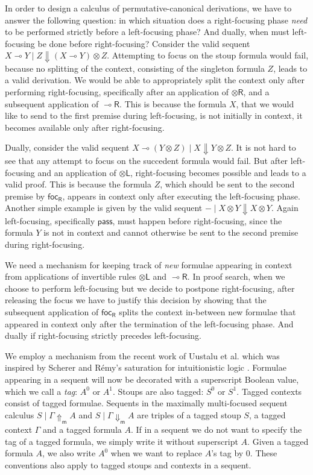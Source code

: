 \documentclass[runningheads]{llncs}
\newcommand{\tl}{\otimes \mathsf{L}}
\newcommand{\tr}{\otimes \mathsf{R}}
\newcommand{\lright}{{\multimap}\mathsf{R}}
\newcommand{\pass}{\mathsf{pass}}
\newcommand{\otL}{\tl}
\newcommand{\otR}{\tr}
\newcommand{\lolliR}{\lright}
\newcommand{\ot}{\otimes}
\newcommand{\lolli}{\multimap}
\newcommand{\dn}{\Downarrow}
\newcommand{\upm}{\Uparrow_{\mathsf{m}}}
\newcommand{\dnm}{\Downarrow_{\mathsf{m}}}
\newcommand{\focR}{\mathsf{foc_R}}
\begin{document}
In order to design a calculus of permutative-canonical derivations, we have to answer the following question: in which situation does a right-focusing phase \emph{need} to be performed strictly before a left-focusing phase? And dually, when must left-focusing be done before right-focusing? 
Consider the valid sequent $X \lolli Y \mid Z \dn (X \lolli Y) \ot Z$. Attempting to focus on the stoup formula would fail, because no splitting of the context, consisting of the singleton formula $Z$, leads to a valid derivation. We would be able to appropriately split the context only after performing right-focusing, specifically after an application of $\otR$, and a subsequent application of $\lolliR$. This is because the formula  $X$, that we would like to send to the first premise during left-focusing, is not initially in context, it becomes available only after right-focusing. 

Dually, consider the valid sequent $X \lolli (Y \ot Z) \mid X \dn Y \ot Z$. It is not hard to see that any attempt to focus on the succedent formula would fail. But after left-focusing and an application of $\otL$, right-focusing becomes possible and leads to a valid proof. This is because the formula $Z$, which should be sent to the second premise by $\focR$, appears in context only after executing the left-focusing phase. Another simple example is given by the valid sequent $- \mid X \ot Y \dn X \ot Y$. Again left-focusing, specifically $\pass$, must happen before right-focusing, since the formula $Y$ is not in context and cannot otherwise be sent to the second premise during right-focusing.

We need a mechanism for keeping track of \emph{new} formulae appearing in context from applications of invertible rules $\otL$ and $\lolliR$. In proof search, when we choose to perform left-focusing but we decide to postpone right-focusing, after releasing the focus we have to justify this decision by showing that the subsequent application of $\focR$ splits the context in-between new formulae that appeared in context only after the termination of the left-focusing phase. And dually if right-focusing strictly precedes left-focusing.

We employ a mechanism from the recent work of Uustalu et al. \cite{UVW:protsn} which was inspired by Scherer and R{\'e}my's saturation for intuitionistic logic \cite{scherer:simple:2015}. Formulae appearing in a sequent will now be decorated with a superscript Boolean value, which we call a \emph{tag}: $A^0$ or $A^1$. 
Stoups are also tagged: $S^0$ or $S^1$. Tagged contexts consist of tagged formulae. Sequents in the maximally multi-focused sequent calculus $S \mid \Gamma \upm A$ and $S \mid \Gamma \dnm A$ are triples of a tagged stoup $S$, a tagged context $\Gamma$ and a tagged formula $A$. If in a sequent we do not want to specify the tag of a tagged formula, we simply write it without superscript $A$. Given a tagged formula $A$, we also write $A^0$ when we want to replace $A$'s tag by $0$. These conventions also apply to tagged stoups and contexts in a sequent.
\end{document}

